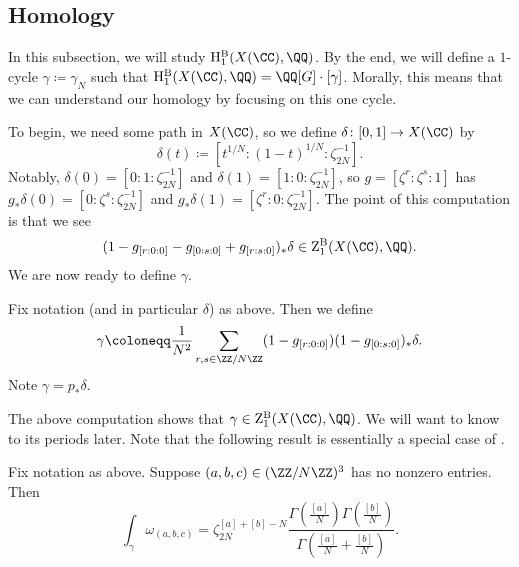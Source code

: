 \documentclass[../thesis.tex]{subfiles}
\begin{document}
\subsection{Homology}
In this subsection, we will study $\mathrm H_1^{\mathrm B}(X(\CC),\QQ)$. By the end, we will define a $1$-cycle $\gamma\coloneqq\gamma_N$ such that $\mathrm H_1^{\mathrm B}(X(\CC),\QQ)=\QQ[G]\cdot[\gamma]$. Morally, this means that we can understand our homology by focusing on this one cycle.

To begin, we need some path in $X(\CC)$, so we define $\delta\colon[0,1]\to X(\CC)$ by
\[\delta(t)\coloneqq\left[t^{1/N}:(1-t)^{1/N}:\zeta_{2N}^{-1}\right].\]
Notably, $\delta(0)=[0:1:\zeta_{2N}^{-1}]$ and $\delta(1)=[1:0:\zeta_{2N}^{-1}]$, so $g=[\zeta^r:\zeta^s:1]$ has $g_*\delta(0)=[0:\zeta^s:\zeta_{2N}^{-1}]$ and $g_*\delta(1)=[\zeta^r:0:\zeta_{2N}^{-1}]$. The point of this computation is that we see
\[(1-g_{[r:0:0]}-g_{[0:s:0]}+g_{[r:s:0]})_*\delta\in\mathrm Z^{\mathrm B}_1(X(\CC),\QQ).\]
We are now ready to define $\gamma$.
\begin{definition}
	Fix notation (and in particular $\delta$) as above. Then we define
	\[\gamma\coloneqq\frac1{N^2}\sum_{r,s\in\ZZ/N\ZZ}(1-g_{[r:0:0]})(1-g_{[0:s:0]})_*\delta.\]
	Note $\gamma=p_*\delta$.
\end{definition}
The above computation shows that $\gamma\in\mathrm Z^{\mathrm B}_1(X(\CC),\QQ)$. We will want to know to its periods later. Note that the following result is essentially a special case of \cite[Lemma~7.12]{deligne-hodge}.
\begin{lemma} \label{lem:gamma-periods}
	Fix notation as above. Suppose $(a,b,c)\in(\ZZ/N\ZZ)^3$ has no nonzero entries. Then
	\[\int_\gamma\omega_{(a,b,c)} = \zeta_{2N}^{[a]+[b]-N}\frac{\Gamma\left(\frac{[a]}N\right)\Gamma\left(\frac{[b]}N\right)}{\Gamma\left(\frac{[a]}N+\frac{[b]}N\right)}.\]
\end{lemma}
\end{document}
